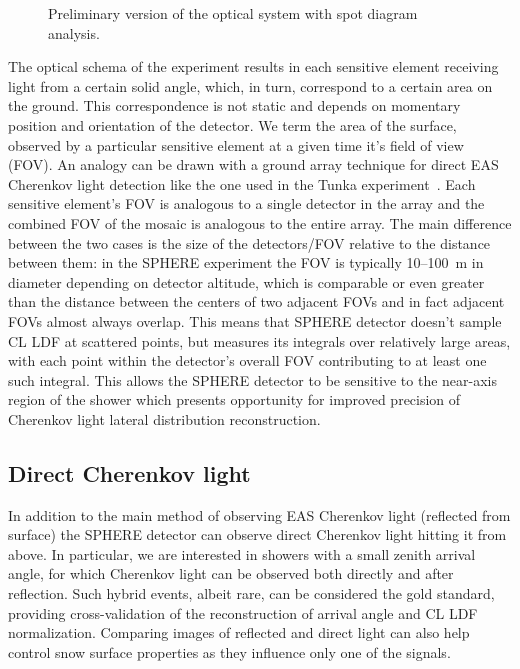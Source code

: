 \documentclass[a4paper,11pt]{article}
\begin{document}
\begin{figure}
\begin{minipage}[b]{.55\textwidth}
        \caption{Preliminary version of the optical system with spot diagram analysis.}
        \label{fig:lightspots}
    \end{minipage}
\end{figure}


The optical schema of the experiment results in each sensitive element receiving light from a certain solid angle, which, in turn, correspond to a certain area on the ground. This correspondence is not static and depends on momentary position and orientation of the detector. We term the area of the surface, observed by a particular sensitive element at a given time it's field of view (FOV). An analogy can be drawn with a ground array technique for direct EAS Cherenkov light detection like the one used in the Tunka experiment~\cite{Berezhnev2012}. Each sensitive element's FOV is analogous to a single detector in the array and the combined FOV of the mosaic is analogous to the entire array. The main difference between the two cases is the size of the detectors/FOV relative to the distance between them: in the SPHERE experiment the FOV is typically 10--100~m in diameter depending on detector altitude, which is comparable or even greater than the distance between the centers of two adjacent FOVs and in fact adjacent FOVs almost always overlap. This means that SPHERE detector doesn't sample CL LDF at scattered points, but measures its integrals over relatively large areas, with each point within the detector's overall FOV contributing to at least one such integral. This allows the SPHERE detector to be sensitive to the near-axis region of the shower which presents opportunity for improved precision of Cherenkov light lateral distribution reconstruction.



\subsection{Direct Cherenkov light}

In addition to the main method of observing EAS Cherenkov light (reflected from surface) the SPHERE detector can observe direct Cherenkov light hitting it from above. In particular, we are interested in showers with a small zenith arrival angle, for which Cherenkov light can be observed both directly and after reflection. Such hybrid events, albeit rare, can be considered the gold standard, providing cross-validation of the reconstruction of arrival angle and CL LDF normalization. Comparing images of reflected and direct light can also help control snow surface properties as they influence only one of the signals.
\end{document}
